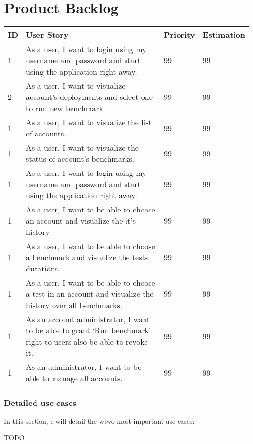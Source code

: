 \section{Product Backlog}
\begin{center}
  \begin{tabular}{ | p{1cm}  | p{9cm}  | p{2cm} | p{2cm}| }
    \hline

    ID & User Story                                                                                                        & Priority        & Estimation\\ \hline

    1 & As a user, I want to login using my username and password and start using the application right away.              & 99              & 99        \\ \hline
    2 & As a user, I want to visualize account’s deployments  and select one to run new benchmark                          & 99              & 99        \\ \hline
    1 & As a user, I want to visualize the list of accounts.                                                               & 99              & 99        \\ \hline
    1 & As a user, I want to visualize the status of account’s benchmarks.                                                 & 99              & 99        \\ \hline
    1 & As a user, I want to login using my username and password and start using the application right away.              & 99              & 99        \\ \hline
    1 & As a user, I want to be able to choose an account and visualize the it’s history                                   & 99              & 99        \\ \hline
    1 & As a user, I want to be able to choose a benchmark and visualize the tests durations.                              & 99              & 99        \\ \hline
    1 & As a user, I want to be able to choose a test in an account and visualize the history over all benchmarks.         & 99              & 99        \\ \hline
    1 & As an account administrator, I want to be able to grant ‘Run benchmark’  right to users also be able to revoke it. & 99              & 99        \\ \hline
    1 & As an administrator, I want to be able to manage all accounts.                                                     & 99              & 99        \\ \hline

    \hline
  \end{tabular}
\end{center}
\subsubsection{Detailed use cases}
In this section, e will detail the wtwo most important use cases:

TODO
